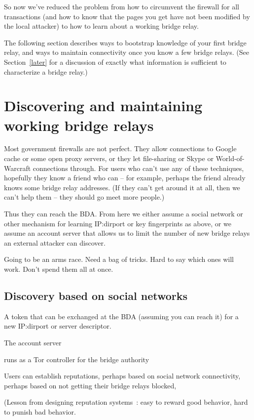 \documentclass{llncs}
\begin{document}
So now we've reduced the problem from how to circumvent the firewall
for all transactions (and how to know that the pages you get have not
been modified by the local attacker) to how to learn about a working
bridge relay.

The following section describes ways to bootstrap knowledge of your first
bridge relay, and ways to maintain connectivity once you know a few
bridge relays. (See Section~\ref{later} for a discussion of exactly
what information is sufficient to characterize a bridge relay.)

\section{Discovering and maintaining working bridge relays}

Most government firewalls are not perfect. They allow connections to
Google cache or some open proxy servers, or they let file-sharing or
Skype or World-of-Warcraft connections through.
For users who can't use any of these techniques, hopefully they know
a friend who can -- for example, perhaps the friend already knows some
bridge relay addresses.
(If they can't get around it at all, then we can't help them -- they
should go meet more people.)

Thus they can reach the BDA. From here we either assume a social
network or other mechanism for learning IP:dirport or key fingerprints
as above, or we assume an account server that allows us to limit the
number of new bridge relays an external attacker can discover.

Going to be an arms race. Need a bag of tricks. Hard to say
which ones will work. Don't spend them all at once.

\subsection{Discovery based on social networks}

A token that can be exchanged at the BDA (assuming you
can reach it) for a new IP:dirport or server descriptor.

The account server

runs as a Tor controller for the bridge authority

Users can establish reputations, perhaps based on social network
connectivity, perhaps based on not getting their bridge relays blocked,

(Lesson from designing reputation systems~\cite{p2p-econ}: easy to
reward good behavior, hard to punish bad behavior.
\end{document}
